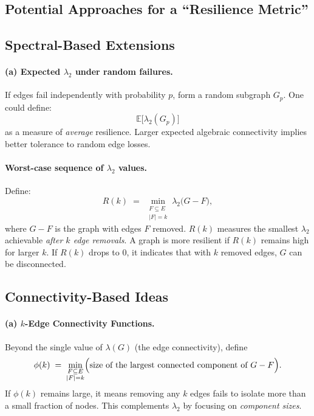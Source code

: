 \subsection{Potential Approaches for a ``Resilience Metric''}

\subsection{Spectral-Based Extensions}

\paragraph{(a) Expected $\lambda_2$ under random failures.}
If edges fail independently with probability $p$, form a random subgraph $G_p$. One could define:
\[
  \mathbb{E}\bigl[\lambda_2(G_p)\bigr]
\]
as a measure of \emph{average} resilience. Larger expected algebraic connectivity implies better tolerance to random edge losses.

\paragraph{Worst-case sequence of $\lambda_2$ values.}
Define:
\[
  R(k)
  \;=\;
  \min_{\substack{F \subseteq E \\ |F| = k}}
  \lambda_2\bigl(G - F\bigr),
\]
where $G - F$ is the graph with edges $F$ removed. $R(k)$ measures the smallest $\lambda_2$ achievable \emph{after $k$ edge removals}. A graph is more resilient if $R(k)$ remains high for larger $k$. If $R(k)$ drops to $0$, it indicates that with $k$ removed edges, $G$ can be disconnected.

\subsection{Connectivity-Based Ideas}

\paragraph{(a) $k$-Edge Connectivity Functions.}
Beyond the single value of $\lambda(G)$ (the edge connectivity), define
\[
   \phi(k)
   \;=\;
   \min_{\substack{F \subseteq E\\|F|=k}}
   \Bigl(\text{size of the largest connected component of }G-F\Bigr).
\]
If $\phi(k)$ remains large, it means removing any $k$ edges fails to isolate more than a small fraction of nodes. This complements $\lambda_2$ by focusing on \emph{component sizes}.

